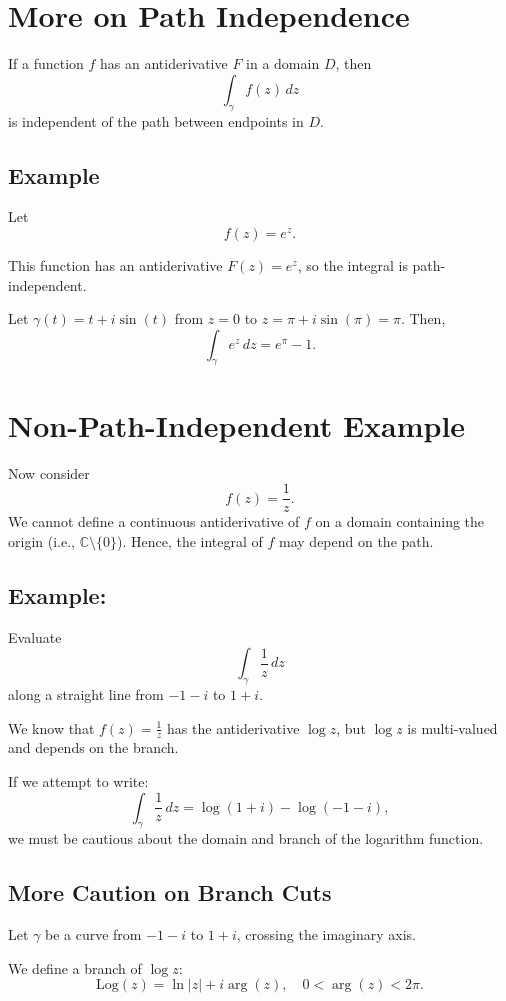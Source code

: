 \documentclass[12pt]{article}
\theoremstyle{definition} %
\theoremstyle{plain} %
\begin{document}
\section*{More on Path Independence}

If a function $f$ has an antiderivative $F$ in a domain $D$, then
\[
\int_{\gamma} f(z)\,dz
\]
is independent of the path between endpoints in $D$.

\subsection*{Example}

Let
\[
f(z) = e^z.
\]

This function has an antiderivative $F(z) = e^z$, so the integral is path-independent.

Let $\gamma(t) = t + i\sin(t)$ from $z = 0$ to $z = \pi + i\sin(\pi) = \pi$. Then,
\[
\int_{\gamma} e^z\,dz = e^{\pi} - 1.
\]

\section*{Non-Path-Independent Example}

Now consider
\[
f(z) = \frac{1}{z}.
\]
We cannot define a continuous antiderivative of $f$ on a domain containing the origin (i.e., $\mathbb{C} \setminus \{0\}$). Hence, the integral of $f$ may depend on the path.

\subsection*{Example:}

Evaluate
\[
\int_{\gamma} \frac{1}{z}\,dz
\]
along a straight line from $-1 - i$ to $1 + i$.

We know that $f(z) = \frac{1}{z}$ has the antiderivative $\log z$, but $\log z$ is multi-valued and depends on the branch.

If we attempt to write:
\[
\int_{\gamma} \frac{1}{z}\,dz = \log(1+i) - \log(-1-i),
\]
we must be cautious about the domain and branch of the logarithm function.

\subsection*{More Caution on Branch Cuts}

Let $\gamma$ be a curve from $-1 - i$ to $1 + i$, crossing the imaginary axis.

We define a branch of $\log z$:
\[
\text{Log}(z) = \ln|z| + i\arg(z), \quad 0 < \arg(z) < 2\pi.
\]
\end{document}
